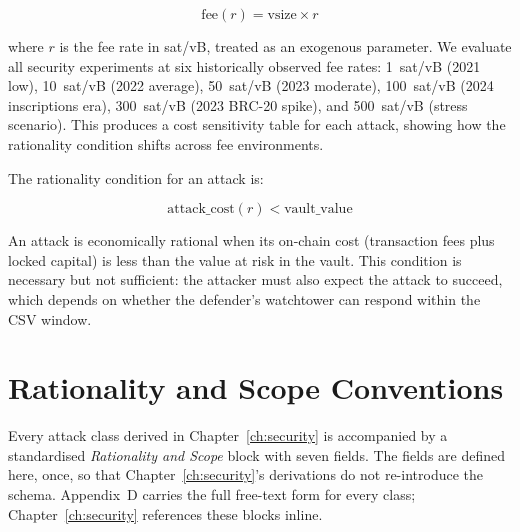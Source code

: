 \begin{equation} \label{eq:fee_projection}
\text{fee}(r) = \text{vsize} \times r
\end{equation}

\noindent
where $r$ is the fee rate in sat/vB, treated as an exogenous parameter. We evaluate
all security experiments at six historically observed fee rates: 1~sat/vB (2021 low),
10~sat/vB (2022 average), 50~sat/vB (2023 moderate), 100~sat/vB (2024 inscriptions
era), 300~sat/vB (2023 BRC-20 spike), and 500~sat/vB (stress scenario). This
produces a cost sensitivity table for each attack, showing how the rationality
condition shifts across fee environments.

The rationality condition for an attack is:

\begin{equation} \label{eq:rationality}
\text{attack\_cost}(r) < \text{vault\_value}
\end{equation}

\noindent
An attack is economically rational when its on-chain cost (transaction fees plus
locked capital) is less than the value at risk in the vault. This condition is
necessary but not sufficient: the attacker must also expect the attack to succeed,
which depends on whether the defender's watchtower can respond within the CSV window.

\section{Rationality and Scope Conventions}
\label{se:rationality_conventions}

Every attack class derived in Chapter~\ref{ch:security} is accompanied
by a standardised \emph{Rationality and Scope} block with seven
fields. The fields are defined here, once, so that Chapter~\ref{ch:security}'s
derivations do not re-introduce the schema. Appendix~D carries the full
free-text form for every class; Chapter~\ref{ch:security} references
these blocks inline.


